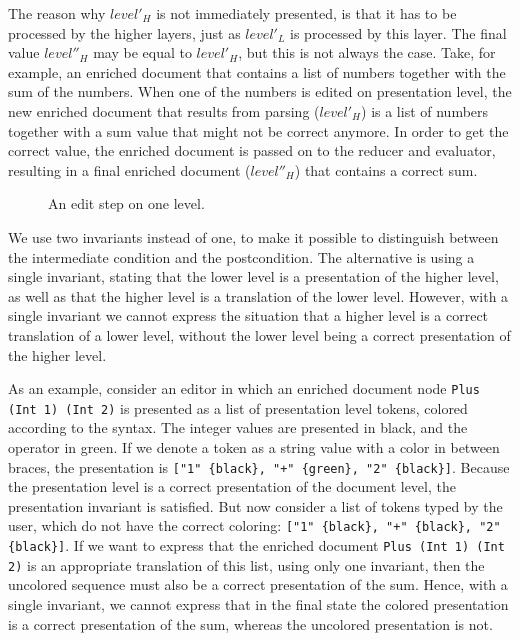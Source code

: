The reason why $level'_{H}$ is not immediately presented, is that it has to be processed by the higher layers, just as $level'_{L}$ is processed by this layer. The final value $level''_{H}$ may be equal to $level'_{H}$, but this is not always the case. Take, for example, an enriched document that contains a list of numbers together with the sum of the numbers. When one of the numbers is edited on presentation level, the new enriched document that results from parsing ($level'_{H}$) is a list of numbers together with a sum value that might not be correct anymore. In order to get the correct value, the enriched document is passed on to the reducer and evaluator, resulting in a final enriched document ($level''_{H}$) that contains a correct sum.

\begin{figure}
\begin{small}
\begin{center}
\begin{center}
\end{center}\caption{An edit step on one level.}\label{layerEditProcess} 
\end{center}
\end{small}
\end{figure}

We use two invariants instead of one, to make it possible to distinguish between the intermediate condition and the postcondition. The alternative is using a single invariant, stating that the lower level is a presentation of the higher level, as well as that the higher level is a translation of the lower level. However, with a single invariant we cannot express the situation that a higher level is a correct translation of a lower level, without the lower level being a correct presentation of the higher level.

As an example, consider an editor in which an enriched document node \verb|Plus (Int 1) (Int 2)| is presented as a list of presentation level tokens, colored according to the syntax. The integer values are presented in black, and the operator in green. If we denote a token as a string value with a color in between braces, the presentation is \verb|["1" {black}, "+" {green}, "2" {black}]|. Because the presentation level is a correct presentation of the document level, the presentation invariant is satisfied. But now consider a list of tokens typed by the user, which do not have the correct coloring: \verb|["1" {black}, "+" {black}, "2" {black}]|. If we want to express that the enriched document \verb|Plus (Int 1) (Int 2)| is an appropriate translation of this list, using only one invariant, then the uncolored sequence must also be a correct presentation of the sum. Hence, with a single invariant, we cannot express that in the final state the colored presentation is a correct presentation of the sum, whereas the uncolored presentation is not. 

